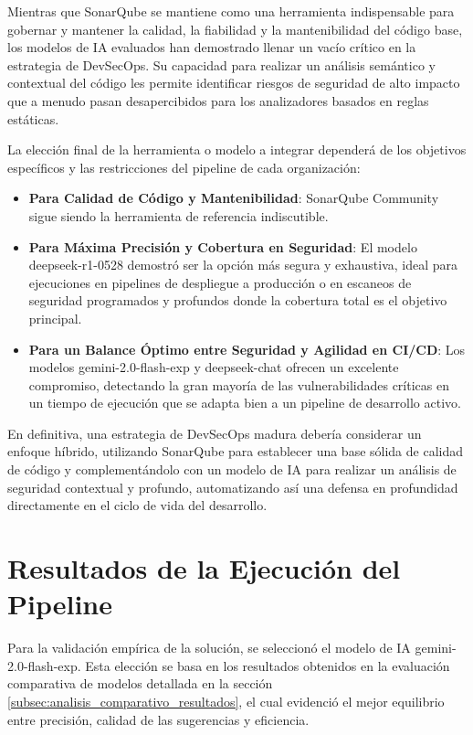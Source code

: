 Mientras que SonarQube se mantiene como una herramienta indispensable para gobernar y mantener la calidad, la fiabilidad y la mantenibilidad del código base, los modelos de IA evaluados han demostrado llenar un vacío crítico en la estrategia de DevSecOps. Su capacidad para realizar un análisis semántico y contextual del código les permite identificar riesgos de seguridad de alto impacto que a menudo pasan desapercibidos para los analizadores basados en reglas estáticas.

La elección final de la herramienta o modelo a integrar dependerá de los objetivos específicos y las restricciones del pipeline de cada organización:
\begin{itemize}
    \item \textbf{Para Calidad de Código y Mantenibilidad}: SonarQube Community sigue siendo la herramienta de referencia indiscutible.
    \item \textbf{Para Máxima Precisión y Cobertura en Seguridad}: El modelo deepseek-r1-0528 demostró ser la opción más segura y exhaustiva, ideal para ejecuciones en pipelines de despliegue a producción o en escaneos de seguridad programados y profundos donde la cobertura total es el objetivo principal.
    \item \textbf{Para un Balance Óptimo entre Seguridad y Agilidad en CI/CD}: Los modelos gemini-2.0-flash-exp y deepseek-chat ofrecen un excelente compromiso, detectando la gran mayoría de las vulnerabilidades críticas en un tiempo de ejecución que se adapta bien a un pipeline de desarrollo activo.
\end{itemize}

En definitiva, una estrategia de DevSecOps madura debería considerar un enfoque híbrido, utilizando SonarQube para establecer una base sólida de calidad de código y complementándolo con un modelo de IA para realizar un análisis de seguridad contextual y profundo, automatizando así una defensa en profundidad directamente en el ciclo de vida del desarrollo.

\section{Resultados de la Ejecución del Pipeline}
\label{subsec:analisis_resultados_pipeline}

Para la validación empírica de la solución, se seleccionó el modelo de IA gemini-2.0-flash-exp. Esta elección se basa en los resultados obtenidos en la evaluación comparativa de modelos detallada en la sección \ref{subsec:analisis_comparativo_resultados}, el cual evidenció el mejor equilibrio entre precisión, calidad de las sugerencias y eficiencia.

